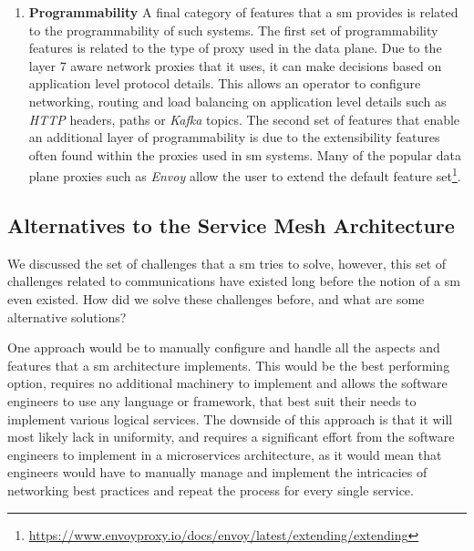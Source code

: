 \begin{enumerate}[leftmargin=3\parindent]
    \item \textbf{Programmability}
    A final category of features that a \gls{sm} provides is related to the programmability of such systems. The first set of programmability features is related to the type of proxy used in the data plane. Due to the layer 7 aware network proxies that it uses, it can make decisions based on application level protocol details. This allows an operator to configure networking, routing and load balancing on application level details such as \textit{HTTP} headers, paths or \textit{Kafka} topics. The second set of features that enable an additional layer of programmability is due to the extensibility features often found within the proxies used in \gls{sm} systems. Many of the popular data plane proxies such as \textit{Envoy} allow the user to extend the default feature set\footnote{\url{https://www.envoyproxy.io/docs/envoy/latest/extending/extending}}.

\end{enumerate}


\subsection{Alternatives to the Service Mesh Architecture}
\label{sec:background:service-mesh:alternatives}

We discussed the set of challenges that a \gls{sm} tries to solve, however, this set of challenges related to communications have existed long before the notion of a \gls{sm} even existed. How did we solve these challenges before, and what are some alternative solutions? 

One approach would be to manually configure and handle all the aspects and features that a \gls{sm} architecture implements. This would be the best performing option, requires no additional machinery to implement and allows the software engineers to use any language or framework, that best suit their needs to implement various logical services. The downside of this approach is that it will most likely lack in uniformity, and requires a significant effort from the software engineers to implement in a microservices architecture, as it would mean that engineers would have to manually manage and implement the intricacies of networking best practices and repeat the process for every single service.

